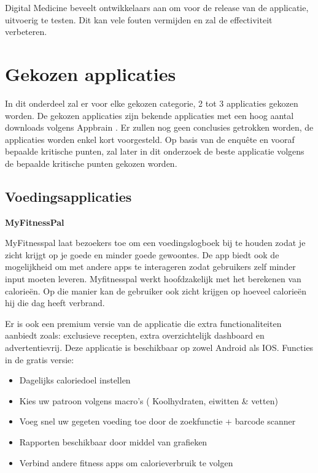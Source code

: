 Digital Medicine beveelt ontwikkelaars aan om voor de release van de applicatie, uitvoerig te testen. Dit kan vele fouten vermijden en zal de effectiviteit verbeteren.

\section{Gekozen applicaties}
\label{sec:gekozen-apps}
In dit onderdeel zal er voor elke gekozen categorie, 2 tot 3 applicaties gekozen worden. De gekozen applicaties zijn bekende applicaties met een hoog aantal downloads volgens Appbrain \autocite{Appbrain2018}. Er zullen nog geen conclusies getrokken worden, de applicaties worden enkel kort voorgesteld. Op basis van de enquête en vooraf bepaalde kritische punten, zal later in dit onderzoek de beste applicatie volgens de bepaalde kritische punten gekozen worden.

\subsection{Voedingsapplicaties}
\label{sec:Voedingsapplicaties}
\textbf{MyFitnessPal}

MyFitnesspal laat bezoekers toe om een voedingslogboek bij te houden zodat je zicht krijgt op je goede en minder goede gewoontes. De app biedt ook de mogelijkheid om met andere apps te interageren zodat gebruikers zelf minder input moeten leveren. Myfitnesspal werkt hoofdzakelijk met het berekenen van calorieën. Op die manier kan de gebruiker ook zicht krijgen op hoeveel calorieën hij die dag heeft verbrand. 

Er is ook een premium versie van de applicatie die extra functionaliteiten aanbiedt zoals: exclusieve recepten, extra overzichtelijk dashboard en advertentievrij.
Deze applicatie is beschikbaar op zowel Android als IOS.
\newpage
Functies in de gratis versie:
\begin{itemize}

    \item Dagelijks caloriedoel instellen
    \item Kies uw patroon volgens macro’s ( Koolhydraten, eiwitten \& vetten)
    \item Voeg snel uw gegeten voeding toe door de zoekfunctie + barcode scanner
    \item Rapporten beschikbaar door middel van grafieken
    \item Verbind andere fitness apps om calorieverbruik te volgen
\end{itemize}

